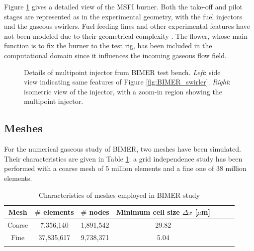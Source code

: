 Figure \ref{fig:BIMER_geometry_flower_details} gives a detailed view of the MSFI burner. Both the take-off and pilot stages are represented as in the experimental geometry, with the fuel injectors and the gaseous swirlers. Fuel feeding lines and other experimental features have not been modeled due to their geometrical complexity . The flower, whose main function is to fix the burner to the test rig, has been included in the computational domain since it influences the incoming gaseous flow field.

\begin{figure}[h!]
	\centering
	\caption[Details of multipoint injector from BIMER test bench.]{Details of multipoint injector from BIMER test bench. \textsl{Left}: side view indicating same features of Figure \ref{fig:BIMER_swirler}. \textsl{Right}: isometric view of the injector, with a zoom-in region showing the multipoint injector.}
	\label{fig:BIMER_geometry_flower_details}
\end{figure}

\subsection{Meshes}

For the numerical gaseous study of BIMER, two meshes have been simulated. Their characteristics are given in Table \ref{tab:BIMER_meshes_gaseous}: a grid independence study has been performed with a coarse mesh of $5$ million elements and a fine one of $38$ million elements. 

\begin{table}[!h]
\centering
\caption{Characteristics of meshes employed in BIMER study}
\begin{tabular}{ccccccc}
\thickhline
Mesh   & $\#$ elements & $\#$ nodes & Minimum cell size $\Delta x$ [$\mu$m] \\
\hline
Coarse & 7,356,140 & 1,891,542 & 29.82 \\ %
Fine & 37,835,617 & 9,738,371 & 5.04\\ %
\thickhline
\end{tabular}
\label{tab:BIMER_meshes_gaseous}
\end{table}


